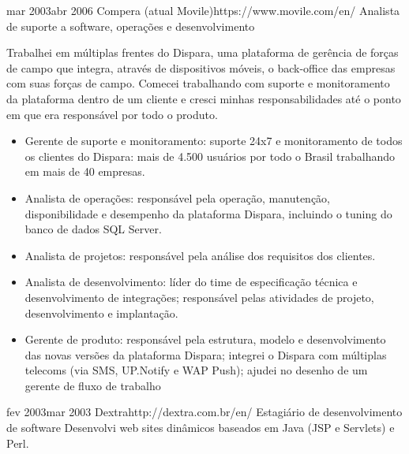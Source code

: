 \documentclass[10pt]{article} %
\begin{document}

\employer
{mar 2003}{abr 2006}
{Compera (atual Movile)}{https://www.movile.com/en/}
\job
{Analista de suporte a software, operações e desenvolvimento}
{Trabalhei em múltiplas frentes do Dispara, uma plataforma de gerência de forças de campo que integra, através de dispositivos móveis, o back-office das empresas com suas forças de campo. Comecei trabalhando com suporte e monitoramento da plataforma dentro de um cliente e cresci minhas responsabilidades até o ponto em que era responsável por todo o produto.

\begin{itemize}
\item{Gerente de suporte e monitoramento: suporte 24x7 e monitoramento de todos os clientes do Dispara: mais de 4.500 usuários por todo o Brasil trabalhando em mais de 40 empresas.}
\item{Analista de operações: responsável pela operação, manutenção, disponibilidade e desempenho da plataforma Dispara, incluindo o tuning do banco de dados SQL Server.}
\item{Analista de projetos: responsável pela análise dos requisitos dos clientes.}
\item{Analista de desenvolvimento: líder do time de especificação técnica e desenvolvimento de integrações; responsável pelas atividades de projeto, desenvolvimento e implantação.}
\item{Gerente de produto: responsável pela estrutura, modelo e desenvolvimento das novas versões da plataforma Dispara; integrei o Dispara com múltiplas telecoms (via SMS, UP.Notify e WAP Push); ajudei no desenho de um gerente de fluxo de trabalho}
\end{itemize}

}


\employer
{fev 2003}{mar 2003}
{Dextra}{http://dextra.com.br/en/}
\job
{Estagiário de desenvolvimento de software}
{Desenvolvi web sites dinâmicos baseados em Java (JSP e Servlets) e Perl.}

\end{document}
